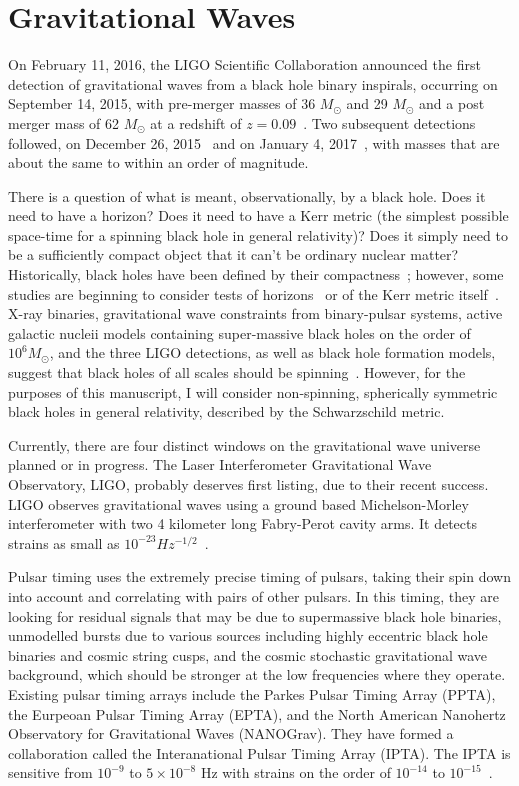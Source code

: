 \section{Gravitational Waves}

On February 11, 2016, the LIGO Scientific Collaboration announced the
first detection of gravitational waves from a black hole binary
inspirals, occurring on September 14, 2015, with pre-merger masses of
36 $M_\odot$ and 29 $M_\odot$ and a post merger mass of 62 $M_\odot$
at a redshift of $z=0.09$~\cite{GW150914}. Two subsequent detections
followed, on December 26, 2015~\cite{GW151226} and on January 4,
2017~\cite{GW170104}, with masses that are about the same to within an order of magnitude.

There is a question of what is meant, observationally, by a black hole. Does it need to have a horizon? Does it need to have a Kerr metric (the simplest possible space-time for a spinning black hole in general relativity)? Does it simply need to be a sufficiently compact object that it can't be ordinary nuclear matter? Historically, black holes have been defined by their compactness~\cite{Bambi2017}; however, some studies are beginning to consider tests of horizons~\cite{} or of the Kerr metric itself~\cite{Bambi2017}. X-ray binaries, gravitational wave constraints from binary-pulsar systems, active galactic nucleii models containing super-massive black holes on the order of $10^6 M_\odot$, and the three LIGO detections, as well as black hole formation models, suggest that black holes of all scales should be spinning~\cite{Bambi2017}. However, for the purposes of this manuscript, I will consider non-spinning, spherically symmetric black holes in general relativity, described by the Schwarzschild metric.

Currently, there are four distinct windows on the gravitational wave universe planned or in progress. The Laser Interferometer Gravitational Wave Observatory, LIGO, probably deserves first listing, due to their recent success. LIGO observes gravitational waves using a ground based Michelson-Morley interferometer with two 4 kilometer long Fabry-Perot cavity arms. It detects strains as small as $10^{-23} Hz^{-1/2}$~\cite{LIGOsensitivity}. 



Pulsar timing uses the extremely precise timing of pulsars, taking their spin down into account and correlating with pairs of other pulsars. In this timing, they are looking for residual signals that may be due to supermassive black hole binaries, unmodelled bursts due to various sources including highly eccentric black hole binaries and cosmic string cusps, and the cosmic stochastic gravitational wave background, which should be stronger at the low frequencies where they operate. Existing pulsar timing arrays include the Parkes Pulsar Timing Array (PPTA), the Eurpeoan Pulsar Timing Array (EPTA), and the North American Nanohertz Observatory for Gravitational Waves (NANOGrav). They have formed a collaboration called the Interanational Pulsar Timing Array (IPTA). The IPTA is sensitive from $10^{-9}$ to $5\times10^{-8}$ Hz with strains on the order of $10^{-14}$ to $10^{-15}$~\cite{hobbs_dai}.





